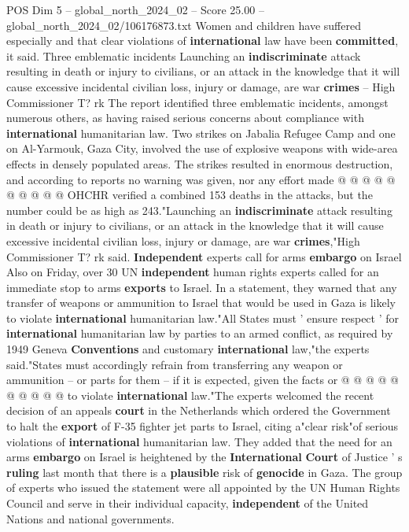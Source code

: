 \begin{textsample}{POS Dim 5 – global\_north\_2024\_02 – Score 25.00 – global\_north\_2024\_02/106176873.txt}
Women and children have suffered especially and that clear violations of \textbf{international} law have been \textbf{committed}, it said.
Three emblematic incidents Launching an \textbf{indiscriminate} attack resulting in death or injury to civilians, or an attack in the knowledge that it will cause excessive incidental civilian loss, injury or damage, are war \textbf{crimes} -- High Commissioner T? rk The report identified three emblematic incidents, amongst numerous others, as having raised serious concerns about compliance with \textbf{international} humanitarian law.
Two strikes on Jabalia Refugee Camp and one on Al-Yarmouk, Gaza City, involved the use of explosive weapons with wide-area effects in densely populated areas.
The strikes resulted in enormous destruction, and according to reports no warning was given, nor any effort made @ @ @ @ @ @ @ @ @ @ OHCHR verified a combined 153 deaths in the attacks, but the number could be as high as 243."Launching an \textbf{indiscriminate} attack resulting in death or injury to civilians, or an attack in the knowledge that it will cause excessive incidental civilian loss, injury or damage, are war \textbf{crimes},"High Commissioner T? rk said. \textbf{Independent} experts call for arms \textbf{embargo} on Israel Also on Friday, over 30 UN \textbf{independent} human rights experts called for an immediate stop to arms \textbf{exports} to Israel.
In a statement, they warned that any transfer of weapons or ammunition to Israel that would be used in Gaza is likely to violate \textbf{international} humanitarian law."All States must ' ensure respect ' for \textbf{international} humanitarian law by parties to an armed conflict, as required by 1949 Geneva \textbf{Conventions} and customary \textbf{international} law,"the experts said."States must accordingly refrain from transferring any weapon or ammunition -- or parts for them -- if it is expected, given the facts or @ @ @ @ @ @ @ @ @ @ to violate \textbf{international} law."The experts welcomed the recent decision of an appeals \textbf{court} in the Netherlands which ordered the Government to halt the \textbf{export} of F-35 fighter jet parts to Israel, citing a"clear risk"of serious violations of \textbf{international} humanitarian law.
They added that the need for an arms \textbf{embargo} on Israel is heightened by the \textbf{International} \textbf{Court} of Justice ' s \textbf{ruling} last month that there is a \textbf{plausible} risk of \textbf{genocide} in Gaza.
The group of experts who issued the statement were all appointed by the UN Human Rights Council and serve in their individual capacity, \textbf{independent} of the United Nations and national governments.

\end{textsample}
